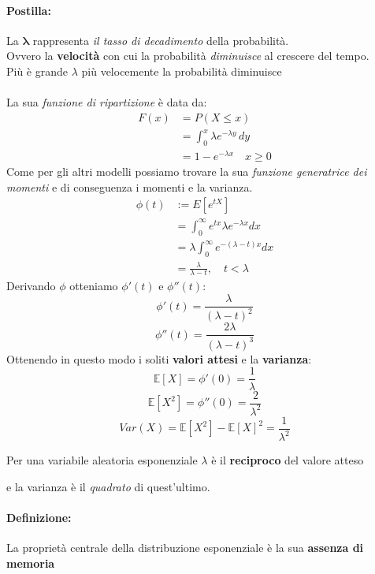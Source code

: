 \documentclass[]{article}
\newcommand{\ev}{\mathbb{E}[X]}
\renewcommand{\ev}[1]{\mathbb{E}[#1]}
\newcommand{\definizione}{\paragraph{Definizione:}}
\begin{document}
    \paragraph{Postilla:} La $\boldsymbol{\lambda}$ rappresenta \textit{il tasso di decadimento} della probabilità. \\
    Ovvero la \textbf{velocità} con cui la probabilità \textit{diminuisce} al crescere del tempo. \\ 
    Più è grande $\lambda$ più velocemente la probabilità diminuisce \\ \\
    La sua \textit{funzione di ripartizione} è data da:
    \begin{equation*}
        \begin{split}
            F(x) &= P(X \leq x) \\
            &= \int_{0}^{x} \lambda e^{-\lambda y} \, dy \\
            &= 1 - e^{-\lambda x} \quad x \geq 0
        \end{split}
    \end{equation*}
    Come per gli altri modelli possiamo trovare la sua \textit{funzione generatrice dei momenti} e di conseguenza i momenti e la varianza. \\
    \begin{equation}
        \begin{aligned}
            \phi(t) & :=E\left[e^{t X}\right] \\
            & =\int_0^{\infty} e^{t x} \lambda e^{-\lambda x} d x \\
            & =\lambda \int_0^{\infty} e^{-(\lambda-t) x} d x \\
            & =\frac{\lambda}{\lambda-t}, \quad t<\lambda
        \end{aligned}
    \end{equation}
    Derivando $\phi$ otteniamo $\phi'(t)$ e $\phi''(t)$:
    \[ \phi'(t) = \frac{\lambda}{(\lambda - t)^2}\]
    \[ \phi''(t) = \frac{2\lambda}{(\lambda - t)^3}\]
    Ottenendo in questo modo i soliti \textbf{valori attesi} e la \textbf{varianza}:
    \[ \ev{X} = \phi'(0) = \frac{1}{\lambda} \]
    \[ \ev{X^2} = \phi''(0) = \frac{2}{\lambda^2} \]
    \[ Var(X) = \ev{X^2} - \ev{X}^2 = \frac{1}{\lambda^2} \]
    \centerline{Per una variabile aleatoria esponenziale $\lambda$ è il \textbf{reciproco} del valore atteso}
    \centerline{e la varianza è il \textit{quadrato} di quest'ultimo.}

    \definizione La proprietà centrale della distribuzione esponenziale è la sua \textbf{assenza di memoria}
\end{document}
